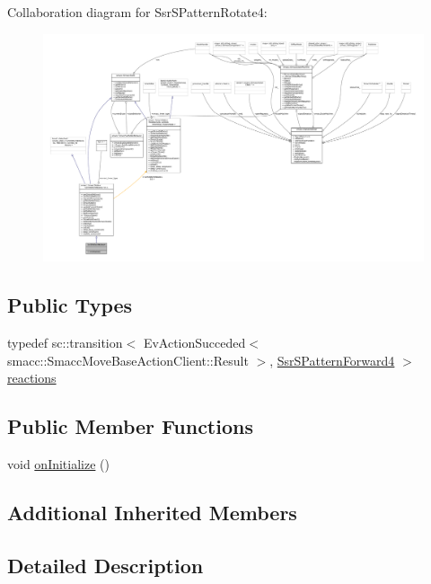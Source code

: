 Collaboration diagram for Ssr\+S\+Pattern\+Rotate4\+:
\nopagebreak
\begin{figure}[H]
\begin{center}
\leavevmode
\includegraphics[width=350pt]{structSsrSPatternRotate4__coll__graph}
\end{center}
\end{figure}
\subsection*{Public Types}
\begin{DoxyCompactItemize}
\item 
typedef sc\+::transition$<$ Ev\+Action\+Succeded$<$ smacc\+::\+Smacc\+Move\+Base\+Action\+Client\+::\+Result $>$, \hyperlink{structSsrSPatternForward4}{Ssr\+S\+Pattern\+Forward4} $>$ \hyperlink{structSsrSPatternRotate4_aaafc6748a8b2861c98d2287590db0852}{reactions}
\end{DoxyCompactItemize}
\subsection*{Public Member Functions}
\begin{DoxyCompactItemize}
\item 
void \hyperlink{structSsrSPatternRotate4_aace2b26d4d2dc87438c14e0c625aeb05}{on\+Initialize} ()
\end{DoxyCompactItemize}
\subsection*{Additional Inherited Members}


\subsection{Detailed Description}


